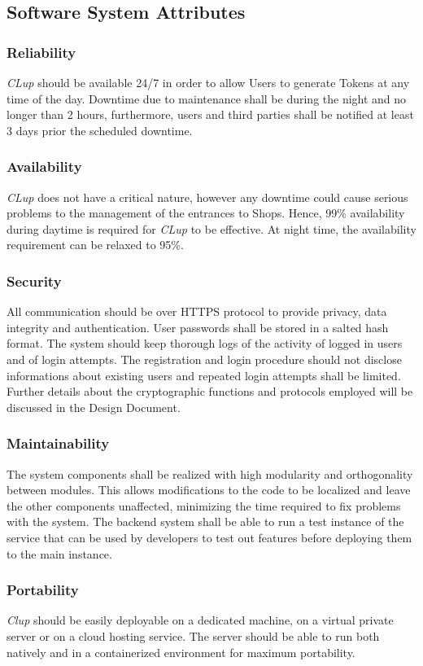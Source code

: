\subsection{Software System Attributes}
\subsubsection{Reliability}
\textit{CLup} should be available 24/7 in order to allow Users to generate Tokens at any time of the day. Downtime due to maintenance shall be during the night and no longer than 2 hours, furthermore, users and third parties shall be notified at least 3 days prior the scheduled downtime.
\subsubsection{Availability}
\emph{CLup} does not have a critical nature, however any downtime could cause serious problems to the management of the entrances to Shops. Hence, 99\% availability during daytime is required for \emph{CLup} to be effective. At night time, the availability requirement can be relaxed to 95\%.
\subsubsection{Security}
All communication should be over HTTPS protocol to provide privacy, data integrity and authentication.
User passwords shall be stored in a salted hash format.
The system should keep thorough logs of the activity of logged in users and of login attempts. The registration and login procedure should not disclose informations about existing users and repeated login attempts shall be limited.
Further details about the cryptographic functions and protocols employed will be discussed in the Design Document.
\subsubsection{Maintainability}
The system components shall be realized with high modularity and orthogonality between modules. This allows modifications to the code to be localized and leave the other components unaffected, minimizing the time required to fix problems with the system.
The backend system shall be able to run a test instance of the service that can be used by developers to test out features before deploying them to the main instance.
\subsubsection{Portability}
\textit{Clup} should be easily deployable on a dedicated machine, on a virtual private server or on a cloud hosting service. The server should be able to run both natively and in a containerized environment for maximum portability.
